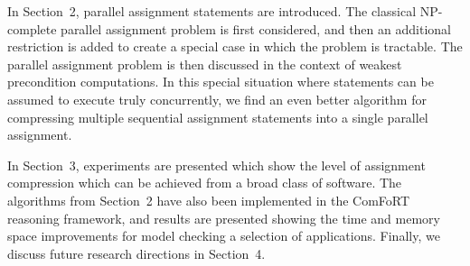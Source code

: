In Section~2, parallel assignment statements are introduced.  The
classical NP-complete parallel assignment problem is first considered,
and then an additional restriction is added to create a special case
in which the problem is tractable.  The parallel assignment problem is
then discussed in the context of weakest precondition computations.
In this special situation where statements can be assumed to execute
truly concurrently, we find an even better algorithm for compressing
multiple sequential assignment statements into a single parallel
assignment.

In Section~3, experiments are presented which show the level of
assignment compression which can be achieved from a broad class of
software.  The algorithms from Section~2 have also been implemented in
the ComFoRT reasoning framework, and results are presented showing the
time and memory space improvements for model checking a selection of
applications. Finally, we discuss future research directions in
Section~4.

